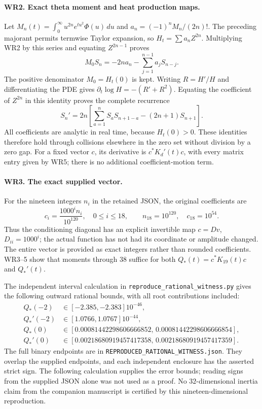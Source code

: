 \paragraph{WR2. Exact theta moment and heat production maps.}
Let $M_n(t)=\int_0^\infty u^{2n}e^{tu^2}\Phi(u)\,du$ and
$a_n=(-1)^nM_n/(2n)!$. The preceding majorant permits termwise
Taylor expansion, so $H_t=\sum a_nZ^{2n}$. Multiplying WR2 by
this series and equating $Z^{2n-1}$ proves
\[
 M_0S_n=-2n a_n-\sum_{j=1}^{n-1}a_jS_{n-j}.
 \tag{WR4}
\]
The positive denominator $M_0=H_t(0)$ is kept. Writing
$R=H'/H$ and differentiating the PDE gives
$\partial_t\log H=-(R'+R^2)$. Equating the coefficient of
$Z^{2n}$ in this identity proves the complete recurrence
\[
 S_n'=2n\left[\sum_{a=1}^nS_aS_{n+1-a}-(2n+1)S_{n+1}\right].
 \tag{WR5}
\]
All coefficients are analytic in real time, because $H_t(0)>0$.
These identities therefore hold through collisions elsewhere in
the zero set without division by a zero gap. For a fixed vector
$c$, its derivative is $c^*K_d'(t)c$, with every matrix entry
given by WR5; there is no additional coefficient-motion term.

\paragraph{WR3. The exact supplied vector.}
For the nineteen integers $n_i$ in the retained JSON, the original
coefficients are
\[
 c_i=\frac{1000^i n_i}{10^{120}},\quad0\le i\le18,
 \qquad n_{18}=10^{120},\quad c_{18}=10^{54}.
 \tag{WR6}
\]
Thus the conditioning diagonal has an explicit invertible map
$c=Dv$, $D_{ii}=1000^i$; the actual function has not had its
coordinate or amplitude changed. The entire vector is provided
as exact integers rather than rounded coefficients. WR3--5 show
that moments through $38$ suffice for both $Q_*(t)=c^*K_{19}(t)c$
and $Q_*'(t)$.

The independent interval calculation in
\texttt{reproduce\_rational\_witness.py} gives the following outward
rational bounds, with all root contributions included:
\[
\begin{aligned}
Q_*(-2)&\in[-2.385,-2.383]10^{-46},\\
Q_*'(-2)&\in[1.0766,1.0767]10^{-44},\\
Q_*(0)&\in[0.00081442298606666852,\,0.00081442298606666854],\\
Q_*'(0)&\in[0.00218680919457417358,\,0.00218680919457417359].
\end{aligned}\tag{WR7}
\]
The full binary endpoints are in
\texttt{REPRODUCED\_RATIONAL\_WITNESS.json}. They overlap the
supplied endpoints, and each independent enclosure has the asserted
strict sign. The following calculation supplies the error bounds;
reading signs from the supplied JSON alone was not used as a proof.
No $32$-dimensional inertia claim from the companion manuscript is
certified by this nineteen-dimensional reproduction.


